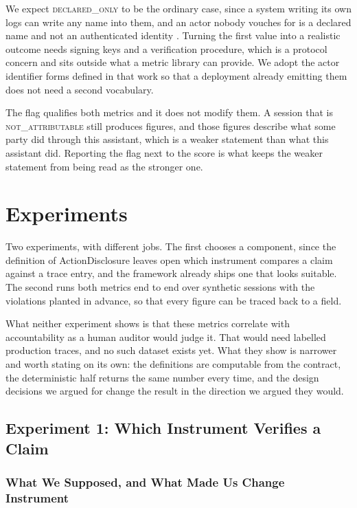 \documentclass[11pt,a4paper]{article}
\begin{document}
We expect \textsc{declared\_only} to be the ordinary case, since a system writing
its own logs can write any name into them, and an actor nobody vouches for is a
declared name and not an authenticated identity \citep{gaussiaboltzmann}. Turning
the first value into a realistic outcome needs signing keys and a verification
procedure, which is a protocol concern and sits outside what a metric library can
provide. We adopt the actor identifier forms defined in that work so that a
deployment already emitting them does not need a second vocabulary.

The flag qualifies both metrics and it does not modify them. A session that is
\textsc{not\_attributable} still produces figures, and those figures describe what
some party did through this assistant, which is a weaker statement than what this
assistant did. Reporting the flag next to the score is what keeps the weaker
statement from being read as the stronger one.

\section{Experiments}
\label{sec:experiments}

Two experiments, with different jobs. The first chooses a component, since the
definition of ActionDisclosure leaves open which instrument compares a claim against
a trace entry, and the framework already ships one that looks suitable. The second
runs both metrics end to end over synthetic sessions with the violations planted in
advance, so that every figure can be traced back to a field.

What neither experiment shows is that these metrics correlate with accountability as
a human auditor would judge it. That would need labelled production traces, and no
such dataset exists yet. What they show is narrower and worth stating on its own: the
definitions are computable from the contract, the deterministic half returns the same
number every time, and the design decisions we argued for change the result in the
direction we argued they would.

\subsection{Experiment 1: Which Instrument Verifies a Claim}

\subsubsection{What We Supposed, and What Made Us Change Instrument}
\end{document}
